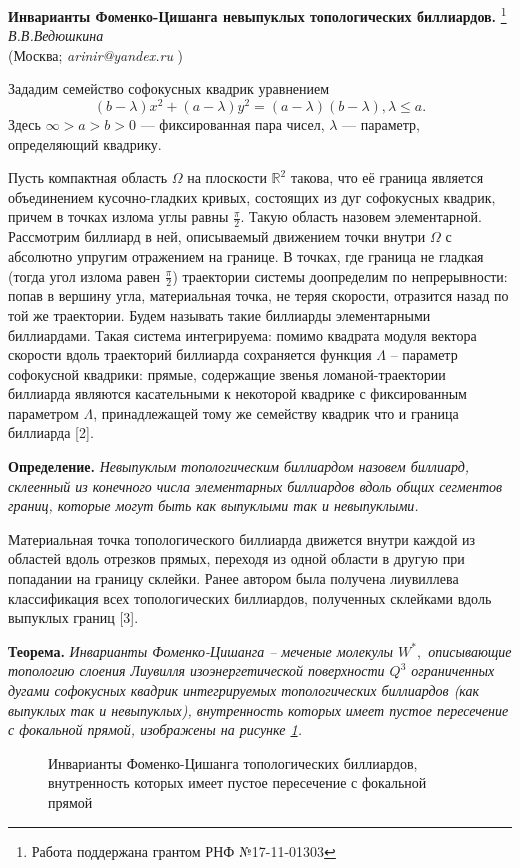 \begin{center}{ \bf   Инварианты Фоменко-Цишанга невыпуклых топологических биллиардов.}%
\footnote{Работа поддержана грантом РНФ №17-11-01303}\\
 {\it В.В.Ведюшкина } \\
(Москва; {\it arinir@yandex.ru} )

\end{center}

Зададим семейство софокусных квадрик уравнением
$$(b-\lambda)x^2+(a-\lambda)y^2=(a-\lambda)(b-\lambda),   \lambda\le a.    $$
Здесь $\infty> a> b>0$ --- фиксированная   пара чисел, $\lambda$ ---
параметр, определяющий квадрику.

Пусть  компактная область $\Omega$  на плоскости $\mathbb{R}^2$  такова, что её граница  является объединением кусочно-гладких кривых, состоящих из дуг софокусных квадрик, причем в точках излома  углы равны $\frac{\pi}{2}$. Такую область назовем элементарной.
Рассмотрим   биллиард  в ней, описываемый движением   точки внутри  $\Omega$ с
абсолютно упругим отражением на границе. В точках,
где граница   не гладкая
(тогда   угол излома  равен $\frac{\pi}{2}$)
 траектории системы  доопределим по непрерывности:  попав в вершину угла, материальная точка, не теряя скорости, отразится назад по той же траектории.  Будем называть такие биллиарды элементарными биллиардами.
 Такая система   интегрируема: помимо квадрата модуля вектора скорости   вдоль траекторий биллиарда сохраняется функция $\Lambda$ -- параметр софокусной квадрики: прямые, содержащие звенья ломаной-траектории биллиарда являются касательными к некоторой квадрике с фиксированным параметром $\Lambda$, принадлежащей тому же семейству квадрик что и граница биллиарда [2].

\textbf{Определение.}
{\it Невыпуклым  топологическим   биллиардом   назовем биллиард,  склеенный из конечного числа элементарных биллиардов вдоль общих   сегментов границ, которые могут быть как выпуклыми так и невыпуклыми.}

Материальная точка  топологического биллиарда движется внутри каждой из областей вдоль отрезков прямых, переходя из одной области в другую при попадании на границу склейки. Ранее автором была получена лиувиллева классификация всех  топологических биллиардов, полученных склейками вдоль выпуклых границ [3].

\textbf{Теорема.}
{\it Инварианты Фоменко-Цишанга -- меченые молекулы $W^*,$ описывающие топологию слоения Лиувилля изоэнергетической поверхности $Q^3$ ограниченных дугами софокусных квадрик интегрируемых топологических    биллиардов (как выпуклых так и невыпуклых),  внутренность которых имеет пустое пересечение с фокальной прямой,   изображены на рисунке \ref{moleculesSimple}.
 }
 \begin{figure}[h!]

\caption{Инварианты Фоменко-Цишанга топологических    биллиардов, внутренность которых имеет пустое пересечение с фокальной прямой}\label{moleculesSimple}
 \end{figure}


